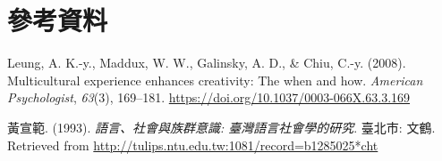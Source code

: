 \documentclass[oneside]{book}
\let\oldhref=\href
\renewcommand{\href}[2]{#2\footnote{\url{#1}}}
\begin{document}
\renewcommand{\href}{\oldhref}

\hypertarget{references}{%
\chapter*{參考資料}\label{references}}

\hypertarget{refs}{}
\leavevmode\hypertarget{ref-leung2008}{}%
Leung, A. K.-y., Maddux, W. W., Galinsky, A. D., \& Chiu, C.-y. (2008). Multicultural experience enhances creativity: The when and how. \emph{American Psychologist}, \emph{63}(3), 169--181. \url{https://doi.org/10.1037/0003-066X.63.3.169}

\leavevmode\hypertarget{ref-huangxuanfan1993}{}%
黃宣範. (1993). \emph{語言、社會與族群意識: 臺灣語言社會學的研究}. 臺北市: 文鶴. Retrieved from \url{http://tulips.ntu.edu.tw:1081/record=b1285025*cht}
\end{document}
